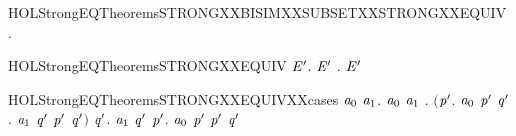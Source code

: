 \newcommand{\HOLStrongEQTheoremsSTRONGXXBISIM}{\UseVerbatim{HOLStrongEQTheoremsSTRONGXXBISIM}}
\begin{SaveVerbatim}{HOLStrongEQTheoremsSTRONGXXBISIMXXSUBSETXXSTRONGXXEQUIV}
\HOLTokenTurnstile{} \HOLSymConst{\HOLTokenForall{}}.   \HOLSymConst{\HOLTokenImp{}}   
\end{SaveVerbatim}
\newcommand{\HOLStrongEQTheoremsSTRONGXXBISIMXXSUBSETXXSTRONGXXEQUIV}{\UseVerbatim{HOLStrongEQTheoremsSTRONGXXBISIMXXSUBSETXXSTRONGXXEQUIV}}
\begin{SaveVerbatim}{HOLStrongEQTheoremsSTRONGXXEQUIV}
\HOLTokenTurnstile{} \HOLSymConst{\HOLTokenForall{}} \ensuremath{\HOLBoundVar{E}\sp{\prime}}.
         \ensuremath{\HOLBoundVar{E}\sp{\prime}} \HOLSymConst{\HOLTokenEquiv{}} \HOLSymConst{\HOLTokenExists{}}.   \ensuremath{\HOLBoundVar{E}\sp{\prime}} \HOLSymConst{\HOLTokenConj{}}  
\end{SaveVerbatim}
\newcommand{\HOLStrongEQTheoremsSTRONGXXEQUIV}{\UseVerbatim{HOLStrongEQTheoremsSTRONGXXEQUIV}}
\begin{SaveVerbatim}{HOLStrongEQTheoremsSTRONGXXEQUIVXXcases}
\HOLTokenTurnstile{} \HOLSymConst{\HOLTokenForall{}}\ensuremath{\HOLBoundVar{a}\sb{\mathrm{0}}} \ensuremath{\HOLBoundVar{a}\sb{\mathrm{1}}}.
        \ensuremath{\HOLBoundVar{a}\sb{\mathrm{0}}} \ensuremath{\HOLBoundVar{a}\sb{\mathrm{1}}} \HOLSymConst{\HOLTokenEquiv{}}
       \HOLSymConst{\HOLTokenForall{}}.
           \ensuremath{(}\HOLSymConst{\HOLTokenForall{}}\ensuremath{\HOLBoundVar{p}\sp{\prime}}. \ensuremath{\HOLBoundVar{a}\sb{\mathrm{0}}} \HOLTokenTransBegin{}\HOLTokenTransEnd \ensuremath{\HOLBoundVar{p}\sp{\prime}} \HOLSymConst{\HOLTokenImp{}} \HOLSymConst{\HOLTokenExists{}}\ensuremath{\HOLBoundVar{q}\sp{\prime}}. \ensuremath{\HOLBoundVar{a}\sb{\mathrm{1}}} \HOLTokenTransBegin{}\HOLTokenTransEnd \ensuremath{\HOLBoundVar{q}\sp{\prime}} \HOLSymConst{\HOLTokenConj{}}  \ensuremath{\HOLBoundVar{p}\sp{\prime}} \ensuremath{\HOLBoundVar{q}\sp{\prime}}\ensuremath{)} \HOLSymConst{\HOLTokenConj{}}
           \HOLSymConst{\HOLTokenForall{}}\ensuremath{\HOLBoundVar{q}\sp{\prime}}. \ensuremath{\HOLBoundVar{a}\sb{\mathrm{1}}} \HOLTokenTransBegin{}\HOLTokenTransEnd \ensuremath{\HOLBoundVar{q}\sp{\prime}} \HOLSymConst{\HOLTokenImp{}} \HOLSymConst{\HOLTokenExists{}}\ensuremath{\HOLBoundVar{p}\sp{\prime}}. \ensuremath{\HOLBoundVar{a}\sb{\mathrm{0}}} \HOLTokenTransBegin{}\HOLTokenTransEnd \ensuremath{\HOLBoundVar{p}\sp{\prime}} \HOLSymConst{\HOLTokenConj{}}  \ensuremath{\HOLBoundVar{p}\sp{\prime}} \ensuremath{\HOLBoundVar{q}\sp{\prime}}
\end{SaveVerbatim}
